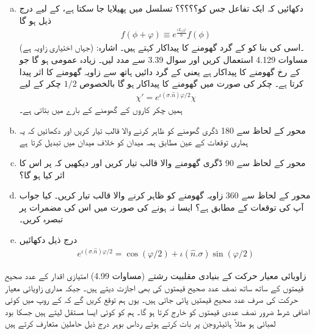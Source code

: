 \begin{enumerate}[a.]
\item  دکھائیں کہ ایک تفاعل  جس کو؟؟؟؟؟ تسلسل میں پھیلایا جا سکتا ہے، کے لیے درج ذیل ہو گا 
\begin{align*}
    f(\phi+\varphi)\equiv e^{\frac{\iota L_z\varphi}{\hslash}}f(\phi)
\end{align*} 
(جہاں  اختیاری زاویہ ہے) ۔اسی کی بنا  کو  کے گرد گھومنے کا پیداکار کہتے ہیں۔ اشارہ: مساوات 4.129 استعمال کریں اور سوال 3.39 سے مدد لیں۔ زیادہ عمومی  ہو گا جو  کے رخ گھومنے کا پیداکار ہے یعنی    کے گرد دائیں ہاتھ سے     زاویہ   گھومنے کا اثر پیدا کرتا ہے۔ چکر کی صورت میں گھومنے کا پیداکار   ہو گا بالخصوص  \(1/2\)  چکر کے لیے
\begin{align}
    \chi'=e^{\iota(\sigma.\hat{n})\varphi/2}\chi
\end{align} ہمیں چکر کاروں کے گھومنے کے بارے میں بتاتی ہے۔
\item محور  کے لحاظ سے 180 ڈگری گھومنے کو ظاہر کرنے والا  قالب تیار کریں اور دکھائیں کہ یہ ہماری توقعات کے عین مطابق ہمہ میدان  کو خلاف میدان  میں تبدیل کرتا ہے 
\item محور  کے لحاظ سے 90 ڈگری گھومنے والا قالب تیار کریں اور دیکھیں کہ  پر اس کا اثر کیا ہو گا؟ 
\item محور  کے لحاظ سے 360 زاویہ گھومنے کو ظاہر کرنے والا قالب تیار کریں۔ کیا جواب آپ کی توقعات کے مطابق ہے؟ ایسا نہ ہونے کی صورت میں اس کی مضمرات پر تبصرہ کریں۔
\item درج ذیل دکھائیں 
\begin{align} e^{\iota(\sigma.\hat{n})\varphi/2}=\cos{(\varphi/2)}+\iota(\hat{n}.\sigma)\sin{(\varphi/2)}
\end{align}
\end{enumerate}
زاویائی معیار حرکت کے بنیادی  مقلبیت  رشتے (مساوات 4.99) امتیازی اقدار کے عدد صحیح قیمتوں کے ساتھ ساتھ نصف عدد صحیح قیمتوں کی بھی اجازت دیتے ہیں۔ جبکہ مداری زاویائی معیار حرکت کی صرف عدد صحیح قیمتیں پائی جاتی ہیں۔ یوں ہم توقع کریں گے کہ  کے روپ میں کوئی اضافی شرط ضرور نصف عددی قیمتوں کو خارج کرتا ہو گا۔ ہم  کو کوئی ایسا مستقل لیتے ہیں جسکا بود لمبائی ہو مثلاً ہائیڈروجن پر بات کرتے ہوئے رداس بوہر درج ذیل حاملین متعارف کرتے ہیں 
